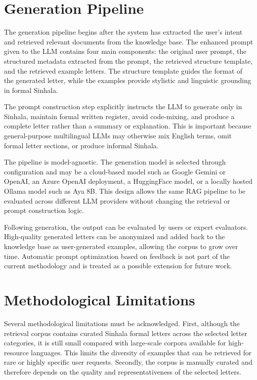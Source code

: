 \documentclass[12pt]{uomthesis}
\begin{document}
\section{Generation Pipeline}
The generation pipeline begins after the system has extracted the user's intent and retrieved relevant documents from the knowledge base. The enhanced prompt given to the LLM contains four main components: the original user prompt, the structured metadata extracted from the prompt, the retrieved structure template, and the retrieved example letters. The structure template guides the format of the generated letter, while the examples provide stylistic and linguistic grounding in formal Sinhala.

The prompt construction step explicitly instructs the LLM to generate only in Sinhala, maintain formal written register, avoid code-mixing, and produce a complete letter rather than a summary or explanation. This is important because general-purpose multilingual LLMs may otherwise mix English terms, omit formal letter sections, or produce informal Sinhala.

The pipeline is model-agnostic. The generation model is selected through configuration and may be a cloud-based model such as Google Gemini or OpenAI, an Azure OpenAI deployment, a HuggingFace model, or a locally hosted Ollama model such as Aya 8B. This design allows the same RAG pipeline to be evaluated across different LLM providers without changing the retrieval or prompt construction logic.

Following generation, the output can be evaluated by users or expert evaluators. High-quality generated letters can be anonymized and added back to the knowledge base as user-generated examples, allowing the corpus to grow over time. Automatic prompt optimization based on feedback is not part of the current methodology and is treated as a possible extension for future work.

\section{Methodological Limitations}

Several methodological limitations must be acknowledged. First, although the retrieval corpus contains curated Sinhala formal letters across the selected letter categories, it is still small compared with large-scale corpora available for high-resource languages. This limits the diversity of examples that can be retrieved for rare or highly specific user requests. Secondly, the corpus is manually curated and therefore depends on the quality and representativeness of the selected letters.
\end{document}
